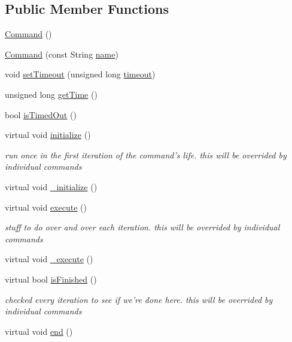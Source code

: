 \subsection*{Public Member Functions}
\begin{DoxyCompactItemize}
\item 
\hyperlink{classCommand_a18df2d81039392daeb0b78c346a70537}{Command} ()
\item 
\hyperlink{classCommand_a5f939f31974c4955c486b18a07675698}{Command} (const String \hyperlink{classCommand_a19f7ad73ca8599ad47f9b7bcccc52610}{name})
\item 
void \hyperlink{classCommand_adfbbaa47b15c80c2a713d24e48b843a8}{set\-Timeout} (unsigned long \hyperlink{classCommand_a687b30a3d41c93f91dfba5a88c98f270}{timeout})
\item 
unsigned long \hyperlink{classCommand_a53de8c6445ccd2f51fe7535a71e20c98}{get\-Time} ()
\item 
bool \hyperlink{classCommand_ac62a4b3acc8db6c5e396d5c97ca51a98}{is\-Timed\-Out} ()
\item 
virtual void \hyperlink{classCommand_a8044ac332a61df571c3454d9fea9684a}{initialize} ()
\begin{DoxyCompactList}\small\item\em run once in the first iteration of the command's life. this will be overrided by individual commands \end{DoxyCompactList}\item 
virtual void \hyperlink{classCommand_ae7c58ad4895c51ff18f1d432dbd4f4ec}{\-\_\-initialize} ()
\item 
virtual void \hyperlink{classCommand_abc8574913684044b0f1a9f810b4e969b}{execute} ()
\begin{DoxyCompactList}\small\item\em stuff to do over and over each iteration. this will be overrided by individual commands \end{DoxyCompactList}\item 
virtual void \hyperlink{classCommand_a49e6861e0c14411d6860f0b3211db9c9}{\-\_\-execute} ()
\item 
virtual bool \hyperlink{classCommand_ae5846b4332a262e055c7a96759fa18f2}{is\-Finished} ()
\begin{DoxyCompactList}\small\item\em checked every iteration to see if we're done here. this will be overrided by individual commands \end{DoxyCompactList}\item 
virtual void \hyperlink{classCommand_a147da4a43c939870018324a0af4c7b0b}{end} ()

\end{DoxyCompactItemize}
